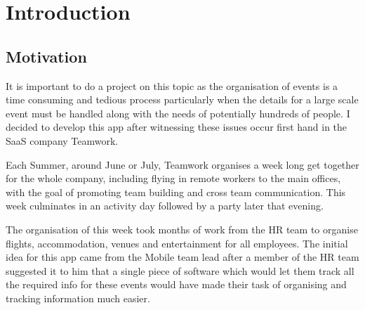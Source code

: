 \chapter{Introduction}
\label{chap:intro}

\section{Motivation} \label{motivation}
It is important to do a project on this topic as the organisation of events is a time consuming and tedious process particularly when the details for a large scale event must be handled along with the needs of potentially hundreds of people. I decided to develop this app after witnessing these issues occur first hand in the SaaS company Teamwork. 

Each Summer, around June or July, Teamwork organises a week long get together for the whole company, including flying in remote workers to the main offices, with the goal of promoting team building and cross team communication. This week culminates in an activity day followed by a party later that evening.

The organisation of this week took months of work from the HR team to organise flights, accommodation, venues and entertainment for all employees. The initial idea for this app came from the Mobile team lead after a member of the HR team suggested it to him that a single piece of software which would let them track all the required info for these events would have made their task of organising and tracking information much easier. 

